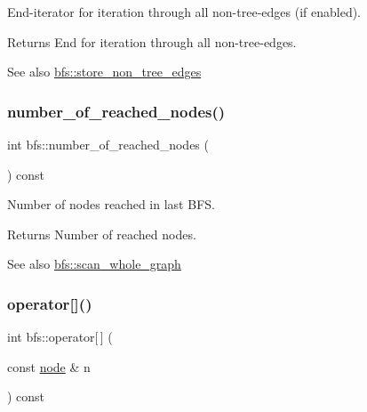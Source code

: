 End-\/iterator for iteration through all non-\/tree-\/edges (if enabled). 

\begin{DoxyReturn}{Returns}
End for iteration through all non-\/tree-\/edges. 
\end{DoxyReturn}
\begin{DoxySeeAlso}{See also}
\mbox{\hyperlink{classbfs_a7de47b820fb9532f497660f767c9457f}{bfs\+::store\+\_\+non\+\_\+tree\+\_\+edges}} 
\end{DoxySeeAlso}
\mbox{\label{classbfs_abb971551139ed87e6c78062275301c1b}} 
\subsubsection{\texorpdfstring{number\+\_\+of\+\_\+reached\+\_\+nodes()}{number\_of\_reached\_nodes()}}
{\footnotesize\ttfamily int bfs\+::number\+\_\+of\+\_\+reached\+\_\+nodes (\begin{DoxyParamCaption}{ }\end{DoxyParamCaption}) const\hspace{0.3cm}{\ttfamily [inline]}}



Number of nodes reached in last B\+FS. 

\begin{DoxyReturn}{Returns}
Number of reached nodes. 
\end{DoxyReturn}
\begin{DoxySeeAlso}{See also}
\mbox{\hyperlink{classbfs_a25fc51b1bfbbdd3afefe0a84c1bd2f6b}{bfs\+::scan\+\_\+whole\+\_\+graph}} 
\end{DoxySeeAlso}
\mbox{\label{classbfs_addc2a3d0a275007455d22f6b76830e66}} 
\subsubsection{\texorpdfstring{operator[]()}{operator[]()}}
{\footnotesize\ttfamily int bfs\+::operator\mbox{[}$\,$\mbox{]} (\begin{DoxyParamCaption}\item[{const \mbox{\hyperlink{classnode}{node}} \&}]{n }\end{DoxyParamCaption}) const\hspace{0.3cm}{\ttfamily [inline]}}



